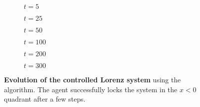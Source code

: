 \begin{figure}
\centering

\begin{subfigure}[t]{.3\textwidth}
	\centering
    	\caption{$t=5$}
	\label{fig:rayleigh_field_0}
\end{subfigure} \quad
\begin{subfigure}[t]{.3\textwidth}
	\centering
    	\caption{$t=25$}
	\label{fig:rayleigh_field_2}
\end{subfigure} \quad
\begin{subfigure}[t]{.3\textwidth}
	\centering
    	\caption{$t=50$}
	\label{fig:rayleigh_field_4}
\end{subfigure}

\medskip

\begin{subfigure}[t]{.3\textwidth}
	\centering
    	\caption{$t=100$}
	\label{fig:rayleigh_field_8}
\end{subfigure} \quad
\begin{subfigure}[t]{.3\textwidth}
	\centering
    	\caption{$t=200$}
	\label{fig:rayleigh_field_10}
\end{subfigure} \quad
\begin{subfigure}[t]{.3\textwidth}
	\centering
    	\caption{$t=300$}
	\label{fig:rayleigh_field_12}
\end{subfigure}

\caption{\textbf{Evolution of the controlled Lorenz system} using the \ppo algorithm. The agent successfully locks the system in the $x<0$ quadrant after a few steps.}
\label{fig:rayleigh_fields}
\end{figure} 
